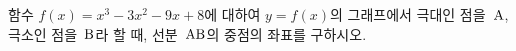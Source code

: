 함수 $f(x)=x^3-3x^2-9x+8$에 대하여 $y=f(x)$의 그래프에서 극대인 점을~$\mathrm{A}$, 극소인 점을~$\mathrm{B}$라 할 때, 선분~$\mathrm{AB}$의 중점의 좌표를 구하시오.
